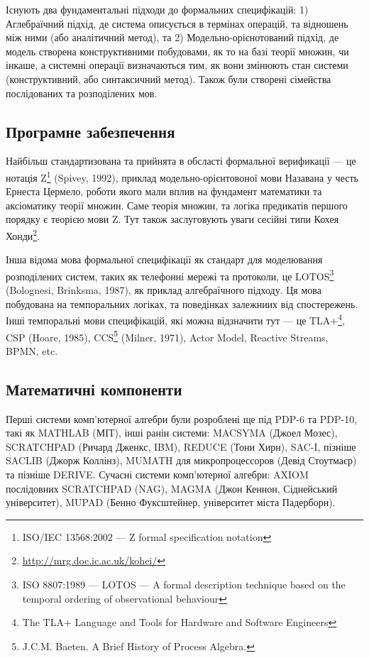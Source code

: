 Існують два фундаментальні підходи до формальних специфікацій: 1) Аглебраїчний підхід, де
система описується в термінах операцій, та відношень між ними (або аналітичний метод), та
2) Модельно-орієнотований підхід, де модель створена конструктивними побудовами,
як то на базі теорії множин, чи інкаше, а системні операції визначаються тим,
як вони змінюють стан системи (конструктивний, або синтаксичний метод).
Також були створені сімейства послідованих та розподілених мов.

\subsection{Програмне забезпечення}
Найбільш стандартизована та прийнята в обсласті формальної верификації --- це нотація
Z\footnote{ISO/IEC 13568:2002 --- Z formal specification notation} (Spivey, 1992), приклад
модельно-орієнтовоної мови
Назавана у честь Ернеста Цермело, роботи якого мали вплив на фундамент математики та аксіоматику
теорії множин. Саме теорія множин, та логіка предикатів першого порядку є теорією мови Z.
Тут також заслуговують уваги сесійні
типи Кохея Хонди\footnote{\url{ http://mrg.doc.ic.ac.uk/kohei/}}.

Інша відома мова формальної специфікації як стандарт
для моделювання розподілених систем, таких як телефонні мережі та протоколи, це
LOTOS\footnote{ISO 8807:1989 --- LOTOS --- A formal description technique based
on the temporal ordering of observational behaviour} (Bolognesi, Brinksma, 1987),
як приклад алгебраїчного підходу.
Ця мова побудована на темпоральних логіках, та поведінках залежниих від спостережень.
Інші темпоральні мови специфікацій, які можна відзначити тут --- це TLA+\footnote{The
TLA+ Language and Tools for Hardware and Software Engineers}, CSP (Hoare, 1985),
CCS\footnote{J.C.M. Baeten. A Brief History of Process Algebra.} (Milner, 1971), Actor Model, Reactive Streams, BPMN, etc.

\subsection{Математичні компоненти}
Перші системи комп'ютерної алгебри були розроблені ще під PDP-6 та PDP-10,
такі як MATHLAB (МІТ), інші ранін системи:
MACSYMA (Джоел Мозес),
SCRATCHPAD (Ричард Дженкс, IBM),
REDUCE (Тони Хирн),
SAC-I, пізніше SACLIB (Джорж Коллінз),
MUMATH для микропроцессоров (Девід Стоутмаєр) та пізніше DERIVE.
Сучасні системи комп'ютерної алгебри:
AXIOM послідовних SCRATCHPAD (NAG),
MAGMA (Джон Кеннон, Сіднейський університет),
MUPAD (Бенно Фуксштейнер, університет міста Падерборн).

